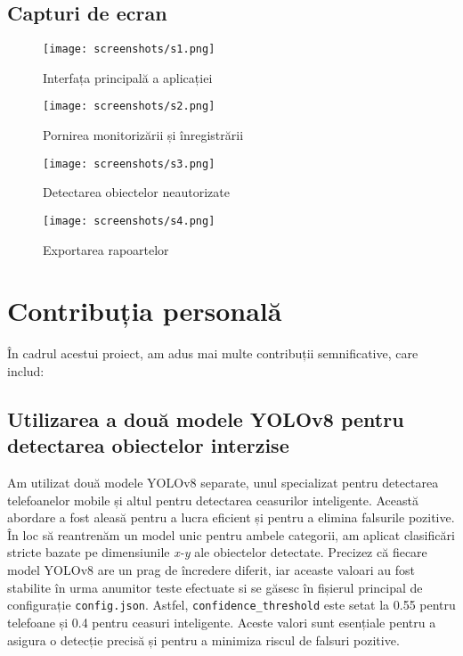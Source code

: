 \documentclass[12pt,a4paper]{article}
\begin{document}
\subsection{Capturi de ecran}

\begin{figure}[H]
    \centering
    \texttt{[image: screenshots/s1.png]}
    \caption{Interfața principală a aplicației}
\end{figure}

\begin{figure}[H]
    \centering
    \texttt{[image: screenshots/s2.png]}
    \caption{Pornirea monitorizării și înregistrării}
\end{figure}

\begin{figure}[H]
    \centering
    \texttt{[image: screenshots/s3.png]}
    \caption{Detectarea obiectelor neautorizate}
\end{figure}

\begin{figure}[H]
    \centering
    \texttt{[image: screenshots/s4.png]}
    \caption{Exportarea rapoartelor}
\end{figure}

\section{Contribuția personală}

În cadrul acestui proiect, am adus mai multe contribuții semnificative, care includ:

\subsection{Utilizarea a două modele YOLOv8 pentru detectarea obiectelor interzise}
Am utilizat două modele YOLOv8 separate, unul specializat pentru detectarea telefoanelor mobile și altul pentru detectarea ceasurilor inteligente. Această abordare a fost aleasă pentru a lucra eficient și pentru a elimina falsurile pozitive. În loc să reantrenăm un model unic pentru ambele categorii, am aplicat clasificări stricte bazate pe dimensiunile \textit{x-y} ale obiectelor detectate. Precizez că fiecare model YOLOv8 are un prag de încredere diferit, iar aceaste valoari au fost stabilite în urma anumitor teste efectuate si se găsesc în fișierul principal de configurație \texttt{config.json}. Astfel, \texttt{confidence\_threshold} este setat la 0.55 pentru telefoane și 0.4 pentru ceasuri inteligente. Aceste valori sunt esențiale pentru a asigura o detecție precisă și pentru a minimiza riscul de falsuri pozitive.
\end{document}
